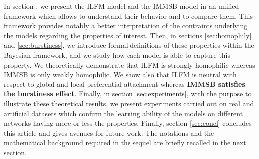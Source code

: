In section \label{sec:models}, we present the ILFM model and the IMMSB model in an unified framework which allows to understand their behavior and to compare them. This framework provides notably a better interpretation of the contraints underlying the models regarding the properties of interest. 
 Then, in sections  \ref{sec:homophily} and \ref{sec:burstiness}, we introduce formal definitions of these properties
within the Bayesian framework, and we study how each model
is able to capture this property. We theoretically demonstrate that ILFM is strongly homophilic whereas IMMSB is only weakly homophilic. We show also that ILFM is neutral with respect to global
and local preferential attachment whereas \textbf{IMMSB satisfies the burstiness effect}.  Finally, in section \ref{sec:experiments}, with the purpose to illustrate these theoretical results, we present experiments carried out on real and artificial datasets which confirm the  learning ability of the models on different networks having more or less the properties. Finally, section \ref{sec:concl} concludes this article and gives avenues for future
work. The notations and the mathematical background required in the sequel are briefly recalled in the next section.
 




